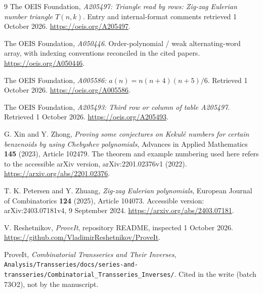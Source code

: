 \documentclass[11pt,a4paper]{article}
\theoremstyle{definition}
\begin{document}
\begin{thebibliography}{9}
The OEIS Foundation, \emph{A205497: Triangle read by rows: Zig-zag Eulerian
number triangle $T(n,k)$}.  Entry and internal-format comments retrieved
1 October 2026. \url{https://oeis.org/A205497}.

The OEIS Foundation, \emph{A050446}.  Order-polynomial / weak alternating-word
array, with indexing conventions reconciled in the cited papers.
\url{https://oeis.org/A050446}.

The OEIS Foundation, \emph{A005586: $a(n)=n(n+4)(n+5)/6$}.
Retrieved 1 October 2026. \url{https://oeis.org/A005586}.

The OEIS Foundation, \emph{A205493: Third row or column of table A205497}.
Retrieved 1 October 2026. \url{https://oeis.org/A205493}.

G. Xin and Y. Zhong, \emph{Proving some conjectures on Kekul\'e numbers for
certain benzenoids by using Chebyshev polynomials}, Advances in Applied
Mathematics \textbf{145} (2023), Article 102479.
The theorem and example numbering used here refers to the accessible
arXiv version, arXiv:2201.02376v1 (2022).
\url{https://arxiv.org/abs/2201.02376}.

T. K. Petersen and Y. Zhuang, \emph{Zig-zag Eulerian polynomials},
European Journal of Combinatorics \textbf{124} (2025), Article 104073.
Accessible version: arXiv:2403.07181v4, 9 September 2024.
\url{https://arxiv.org/abs/2403.07181}.

V. Reshetnikov, \emph{ProveIt}, repository README, inspected 1 October 2026.
\url{https://github.com/VladimirReshetnikov/ProveIt}.

ProveIt, \emph{Combinatorial Transseries and Their Inverses},
\nolinkurl{Analysis/Transseries/docs/series-and-transseries/Combinatorial_Transseries_Inverses/}.
Cited in the write
(batch 73O2), not by the manuscript.
\end{thebibliography}
\end{document}
